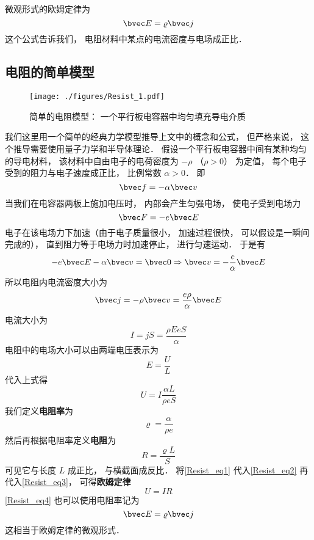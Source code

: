 微观形式的欧姆定律为
\begin{equation}
\bvec E = \varrho\bvec j
\end{equation}
这个公式告诉我们， 电阻材料中某点的电流密度与电场成正比．

\subsection{电阻的简单模型}
\begin{figure}[ht]
\centering
\texttt{[image: ./figures/Resist\_1.pdf]}
\caption{简单的电阻模型： 一个平行板电容器中均匀填充导电介质} \label{Resist_fig1}
\end{figure}

我们这里用一个简单的经典力学模型推导上文中的概念和公式， 但严格来说， 这个推导需要使用量子力学和半导体理论． 假设一个平行板电容器中间有某种均匀的导电材料， 该材料中自由电子的电荷密度为 $-\rho$ （$\rho > 0$） 为定值， 每个电子受到的阻力与电子速度成正比， 比例常数 $\alpha > 0$． 即
\begin{equation}
\bvec f = -\alpha \bvec v
\end{equation}
当我们在电容器两板上施加电压时， 内部会产生匀强电场， 使电子受到电场力
\begin{equation}
\bvec F = -e\bvec E
\end{equation}
电子在该电场力下加速（由于电子质量很小， 加速过程很快， 可以假设是一瞬间完成的）， 直到阻力等于电场力时加速停止， 进行匀速运动． 于是有
\begin{equation}
-e\bvec E - \alpha \bvec v = \bvec 0 \Rightarrow \bvec v = -\frac{e}{\alpha}\bvec E
\end{equation}
所以电阻内电流密度大小为
\begin{equation}\label{Resist_eq4}
\bvec j = -\rho \bvec v = \frac{e\rho}{\alpha}\bvec E
\end{equation}
电流大小为
\begin{equation}
I = jS = \frac{\rho EeS}{\alpha}
\end{equation}
电阻中的电场大小可以由两端电压表示为
\begin{equation}
E = \frac UL
\end{equation}
代入上式得
\begin{equation}\label{Resist_eq3}
U = I \frac{\alpha L}{\rho eS}
\end{equation}
我们定义\textbf{电阻率}为
\begin{equation}\label{Resist_eq1}
\varrho = \frac{\alpha}{\rho e}
\end{equation}
然后再根据电阻率定义\textbf{电阻}为
\begin{equation}\label{Resist_eq2}
R = \frac{\varrho L}{S}
\end{equation}
可见它与长度 $L$ 成正比， 与横截面成反比． 将\autoref{Resist_eq1} 代入\autoref{Resist_eq2} 再代入\autoref{Resist_eq3}， 可得\textbf{欧姆定律}
\begin{equation}
U = IR
\end{equation}
\autoref{Resist_eq4} 也可以使用电阻率记为
\begin{equation}
\bvec E = \varrho\bvec j
\end{equation}
这相当于欧姆定律的微观形式．
